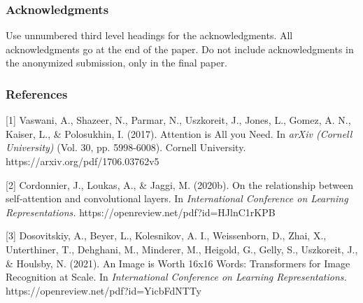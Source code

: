 \documentclass{article} %
\begin{document}
\subsubsection*{Acknowledgments}

Use unnumbered third level headings for the acknowledgments. All
acknowledgments go at the end of the paper. Do not include 
acknowledgments in the anonymized submission, only in the 
final paper. 

\subsubsection*{References}

\small{
[1] Vaswani, A., Shazeer, N., Parmar, N., Uszkoreit, J., Jones, L., 
Gomez, A. N., Kaiser, L., \& Polosukhin, I. (2017). Attention is All 
you Need. In {\it arXiv (Cornell University)} (Vol. 30, pp. 5998-6008). 
Cornell University. https://arxiv.org/pdf/1706.03762v5

[2] Cordonnier, J., Loukas, A., \& Jaggi, M. (2020b). On the 
relationship between self-attention and convolutional layers. In {\it International 
Conference on Learning Representations.} https://openreview.net/pdf?id=HJlnC1rKPB

[3] Dosovitskiy, A., Beyer, L., Kolesnikov, A. I., Weissenborn, D., Zhai, X., 
Unterthiner, T., Dehghani, M., Minderer, M., Heigold, G., Gelly, S., Uszkoreit, 
J., \& Houlsby, N. (2021). An Image is Worth 16x16 Words: Transformers for Image 
Recognition at Scale. In {\it International Conference on Learning Representations.}
https://openreview.net/pdf?id=YicbFdNTTy

}
\end{document}
